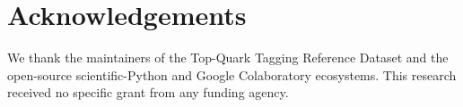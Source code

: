 \documentclass[preprint,12pt]{elsarticle}
\begin{document}
\section*{Acknowledgements}
We thank the maintainers of the Top-Quark Tagging Reference Dataset and the
open-source scientific-Python and Google Colaboratory ecosystems. This
research received no specific grant from any funding agency.

\nocite{salam2010,komiske2019efn,paszke2019pytorch,harris2020numpy,
pedregosa2011scikit,hunter2007matplotlib}



\end{document}
